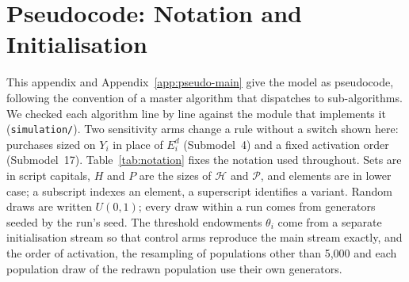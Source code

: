 \section{Pseudocode: Notation and Initialisation}
\label{app:pseudo-init}

This appendix and Appendix~\ref{app:pseudo-main} give the model as pseudocode, following the
convention of a master algorithm that dispatches to sub-algorithms. We checked each algorithm
line by line against the module that implements it (\texttt{simulation/}). Two
sensitivity arms change a rule without a switch shown here: purchases sized on $Y_i$ in place of
$E^d_i$ (Submodel~4) and a fixed activation order (Submodel~17). Table~\ref{tab:notation} fixes the notation used throughout.
Sets are in script capitals, $H$ and $P$ are the sizes of $\mathcal{H}$ and $\mathcal{P}$, and
elements are in lower case; a
subscript indexes an element, a superscript identifies a variant. Random draws are written
$U(0,1)$; every draw within a run comes from generators seeded by the run's seed. The threshold
endowments $\theta_i$ come from a separate initialisation stream so that control arms reproduce
the main stream exactly, and the order of activation, the resampling of populations other
than 5{,}000 and each population draw of the redrawn population use their own generators.

